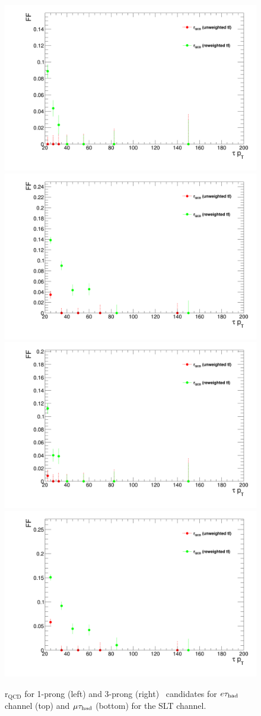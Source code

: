 \begin{figure}
\centering
\includegraphics[width=.4\textwidth]{DiHiggs/plots/FF_CRs/SLTElecrQCD1p.png}
\includegraphics[width=.4\textwidth]{DiHiggs/plots/FF_CRs/SLTElecrQCD3p.png} \\
\includegraphics[width=.4\textwidth]{DiHiggs/plots/FF_CRs/SLTMuonrQCD1p.png}
\includegraphics[width=.4\textwidth]{DiHiggs/plots/FF_CRs/SLTMuonrQCD3p.png}\\
\caption{$\mathrm{r}_{\mathrm{QCD}}$ for 1-prong (left) and 3-prong (right) \tauhad\ candidates for $e\tau_{\mathrm{had}}$ channel (top) and $\mu\tau_{\mathrm{had}}$ (bottom)
for the SLT channel.}
\label{fig:SLT_rQCD}
\end{figure}


